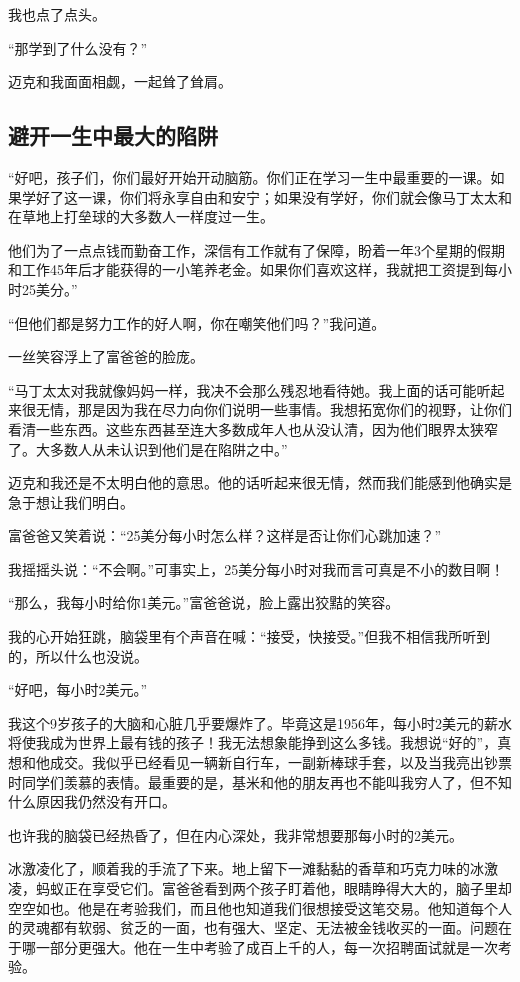 我也点了点头。

“那学到了什么没有？”

迈克和我面面相觑，一起耸了耸肩。

\subsection*{避开一生中最大的陷阱}
“好吧，孩子们，你们最好开始开动脑筋。你们正在学习一生中最重要的一课。如果学好了这一课，你们将永享自由和安宁；如果没有学好，你们就会像马丁太太和在草地上打垒球的大多数人一样度过一生。

他们为了一点点钱而勤奋工作，深信有工作就有了保障，盼着一年3个星期的假期和工作45年后才能获得的一小笔养老金。如果你们喜欢这样，我就把工资提到每小时25美分。”

“但他们都是努力工作的好人啊，你在嘲笑他们吗？”我问道。

一丝笑容浮上了富爸爸的脸庞。

“马丁太太对我就像妈妈一样，我决不会那么残忍地看待她。我上面的话可能听起来很无情，那是因为我在尽力向你们说明一些事情。我想拓宽你们的视野，让你们看清一些东西。这些东西甚至连大多数成年人也从没认清，因为他们眼界太狭窄了。大多数人从未认识到他们是在陷阱之中。”

迈克和我还是不太明白他的意思。他的话听起来很无情，然而我们能感到他确实是急于想让我们明白。

富爸爸又笑着说：“25美分每小时怎么样？这样是否让你们心跳加速？”

我摇摇头说：“不会啊。”可事实上，25美分每小时对我而言可真是不小的数目啊！

“那么，我每小时给你1美元。”富爸爸说，脸上露出狡黠的笑容。

我的心开始狂跳，脑袋里有个声音在喊：“接受，快接受。”但我不相信我所听到的，所以什么也没说。

“好吧，每小时2美元。”

我这个9岁孩子的大脑和心脏几乎要爆炸了。毕竟这是1956年，每小时2美元的薪水将使我成为世界上最有钱的孩子！我无法想象能挣到这么多钱。我想说“好的”，真想和他成交。我似乎已经看见一辆新自行车，一副新棒球手套，以及当我亮出钞票时同学们羡慕的表情。最重要的是，基米和他的朋友再也不能叫我穷人了，但不知什么原因我仍然没有开口。

也许我的脑袋已经热昏了，但在内心深处，我非常想要那每小时的2美元。

冰激凌化了，顺着我的手流了下来。地上留下一滩黏黏的香草和巧克力味的冰激凌，蚂蚁正在享受它们。富爸爸看到两个孩子盯着他，眼睛睁得大大的，脑子里却空空如也。他是在考验我们，而且他也知道我们很想接受这笔交易。他知道每个人的灵魂都有软弱、贫乏的一面，也有强大、坚定、无法被金钱收买的一面。问题在于哪一部分更强大。他在一生中考验了成百上千的人，每一次招聘面试就是一次考验。

